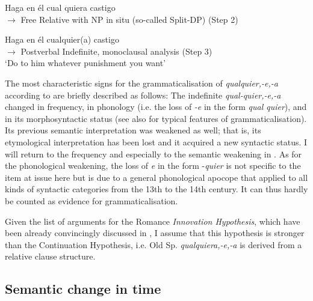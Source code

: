 \ex Haga en él cual quiera castigo\\ 
$\rightarrow$ Free Relative with NP in situ (so-called Split-DP) \hfill (Step 2)

\ex Haga en él cualquier(a) castigo\\ 
$\rightarrow$ Postverbal Indefinite, monoclausal analysis \hfill (Step 3)\\
‘Do to him whatever punishment you want’

\z 
\z


The most characteristic signs for the grammaticalisation of \textit{qualquier,-e,-a} according to \citet{cp2009} are briefly described as follows: The indefinite \textit{qual-quier,-e,-a} changed in frequency, in phonology (i.e. the loss of \textit{-e} in the form \textit{qual quier}), and in its morphosyntactic status (see also \citealt{Lehmann1995} for typical features of grammaticalisation). Its previous semantic interpretation was weakened as well; that is, its etymological interpretation has been lost and it acquired a new syntactic status. I will return to the frequency and especially to the semantic weakening in . As for the phonological weakening, the loss of \textit{e} in the form -\textit{quier} is not specific to the item at issue here but is due to a general phonological apocope that applied to all kinds of syntactic categories from the 13th to the 14th century. It can thus hardly be counted as evidence for grammaticalisation.

Given the list of arguments for the Romance \textit{Innovation Hypothesis}, which have been already convincingly discussed in \citet{Lombard1938,Lombard1947}, I assume that this hypothesis is stronger than the {Continuation Hypothesis}, i.e. Old Sp.\textbf{} \textit{qualquiera,-e,-a} is derived from a relative clause structure.

\subsection{{Semantic} {change} {in} {time}} \label{sec:2.6.2}

